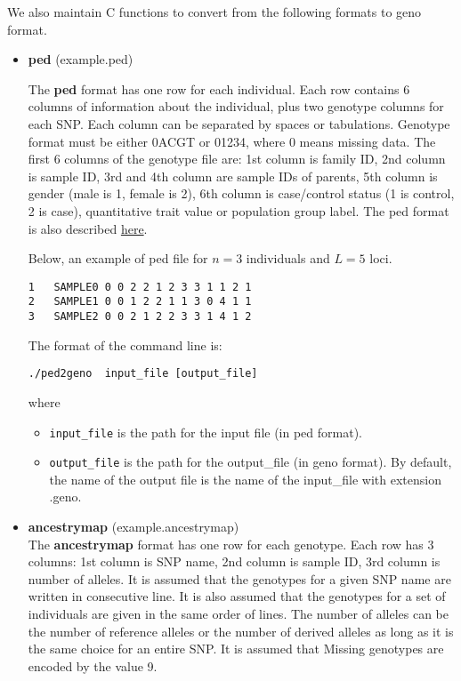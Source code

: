 \documentclass[10pt,a4paper]{article}
\begin{document}
\noindent
We also maintain C functions to convert from the following formats to geno format.
\begin{itemize}
\item {\bf ped} (example.ped)

The {\bf ped} format has one row for each individual. Each row contains 6 columns of information about the individual, plus two genotype columns for each SNP. Each column can be separated by spaces or tabulations. Genotype format must be either 0ACGT or 01234, where 0 means missing data. The first 6 columns of the genotype file are: 1st column is family ID, 2nd column is sample ID, 3rd and 4th column are sample IDs of parents, 5th column is gender (male is 1, female is 2), 6th column is case/control status (1 is control, 2 is case), quantitative trait value or population group label. 
The ped format is also described \href{http://pngu.mgh.harvard.edu/~purcell/plink/data.shtml#ped}{here}.

Below, an example of ped file for $n=3$ individuals and $L=5$ loci.
\begin{center}
\footnotesize
\begin{Verbatim}[frame=single]
1	SAMPLE0 0 0 2 2	1 2 3 3	1 1 2 1
2	SAMPLE1 0 0 1 2 2 1 1 3 0 4 1 1
3	SAMPLE2 0 0 2 1 2 2 3 3	1 4 1 2
\end{Verbatim}
\end{center}

The format of the command line is:
\begin{Verbatim}[frame=single]
./ped2geno  input_file [output_file]
\end{Verbatim}
where 
\begin{itemize}
\item \verb|input_file| is the path for the input file (in ped format).
\item \verb|output_file| is the path for the output\_file (in geno format). 
By default, the name of the output file is the name of the input\_file with extension .geno.

\end{itemize}

\item {\bf ancestrymap} (example.ancestrymap)\\
The {\bf ancestrymap} format has one row for each genotype. Each row has 3 columns: 1st column is SNP name, 2nd column is sample ID, 3rd column is number of alleles. It is assumed that the genotypes for a given SNP name are written in consecutive line. It is also assumed that the genotypes for a set of individuals are given in the same order of lines. The number of alleles can be the number of reference alleles or the number of derived alleles as long as it is the same choice for an entire SNP. It is assumed that Missing genotypes are encoded by the value 9.


\end{itemize}
\end{document}
